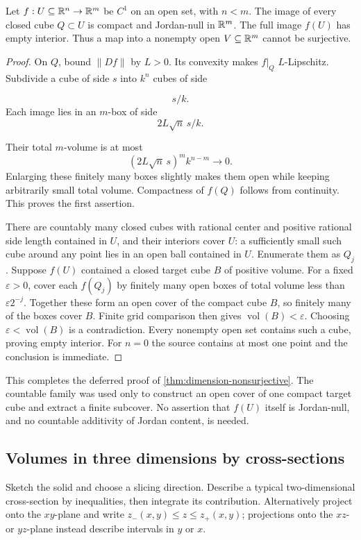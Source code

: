 \begin{theorem}
\label{thm:lower-dimensional-image}
Let $f:U\subseteq\mathbb{R}^n\to\mathbb{R}^m$ be $C^1$ on an open set, with $n<m$.
The image of every closed cube $Q\subset U$ is compact and Jordan-null
in $\mathbb{R}^m$. The full image $f(U)$ has empty interior. Thus a map into a
nonempty open $V\subseteq\mathbb{R}^m$ cannot be surjective.
\end{theorem}
\begin{proof}
On $Q$, bound $\|Df\|$ by $L>0$. Its convexity makes $f|_Q$
$L$-Lipschitz. Subdivide a cube of side $s$ into $k^n$ cubes of side

\[
s/k.
\]
 Each image lies in an $m$-box of side
\[
2L\sqrt n\,s/k.
\]

Their total $m$-volume is at most
\[
(2L\sqrt n\,s)^m k^{n-m}\longrightarrow0.
\]
Enlarging these finitely many boxes slightly makes them open while
keeping arbitrarily small total volume. Compactness of $f(Q)$ follows
from continuity. This proves the first assertion.

There are countably many closed cubes with rational center and positive
rational side length contained in $U$, and their interiors cover $U$:
a sufficiently small such cube around any point lies in an open ball
contained in $U$. Enumerate them as $Q_j$.
Suppose $f(U)$ contained a closed target cube $B$ of positive volume.
For a fixed $\varepsilon>0$, cover each $f(Q_j)$ by finitely many open
boxes of total volume less than $\varepsilon 2^{-j}$.
Together these form an open cover of the compact cube $B$, so finitely
many of the boxes cover $B$. Finite grid comparison then gives
$\operatorname{vol}(B)<\varepsilon$. Choosing
$\varepsilon<\operatorname{vol}(B)$ is a contradiction.
Every nonempty open set contains such a cube, proving empty interior.
For $n=0$ the source contains at most one point and the conclusion is immediate.
\end{proof}
This completes the deferred proof of \cref{thm:dimension-nonsurjective}.
The countable family was used only to construct an open cover of one
compact target cube and extract a finite subcover. No assertion that
$f(U)$ itself is Jordan-null, and no countable additivity of Jordan
content, is needed.

\subsection{Volumes in three dimensions by cross-sections}
Sketch the solid and choose a slicing direction. Describe a typical
two-dimensional cross-section by inequalities, then integrate its
contribution. Alternatively project onto the $xy$-plane
and write $z_-(x,y)\leq z\leq z_+(x,y)$; projections onto the $xz$- or
$yz$-plane instead describe intervals in $y$ or $x$.

